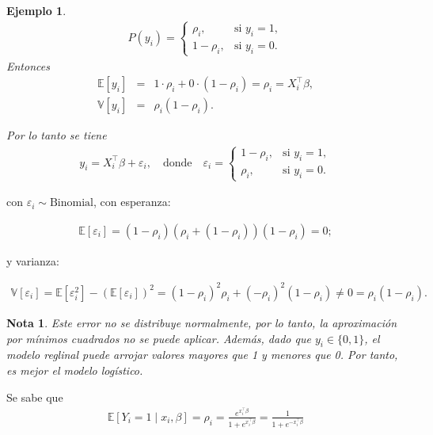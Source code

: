 \documentclass[12pt]{article}
\newtheorem{Note}{Nota}%
\newtheorem{Ejem}{Ejemplo}%
\begin{document}
\begin{Ejem}
\begin{eqnarray*}
P(y_i) = 
\begin{cases}
\rho_i, & \text{si } y_i = 1, \\
1 - \rho_i, & \text{si } y_i = 0.
\end{cases}
\end{eqnarray*}
Entonces
\begin{eqnarray*}
\mathbb{E}[y_i] &=& 1 \cdot \rho_i + 0 \cdot (1 - \rho_i) = \rho_i = X_i^\top \beta,\\
\mathbb{V}[y_i] &=& \rho_i (1 - \rho_i).
\end{eqnarray*}

Por lo tanto se tiene
\begin{eqnarray*}
y_i = X_i^\top \beta + \varepsilon_i, \quad \text{donde} \quad
\varepsilon_i =
\begin{cases}
1 - \rho_i, & \text{si } y_i = 1, \\
 \rho_i, & \text{si } y_i = 0.
\end{cases}
\end{eqnarray*}

\end{Ejem}
con $\varepsilon_i \sim \text{Binomial}$, con esperanza:

\begin{eqnarray*}
\mathbb{E}[\varepsilon_i] = (1 - \rho_i)(\rho_i + (1 - \rho_i))(1 - \rho_i) = 0;
\end{eqnarray*}

y varianza:

\begin{eqnarray*}
\mathbb{V}[\varepsilon_i] = \mathbb{E}[\varepsilon_i^2] - (\mathbb{E}[\varepsilon_i])^2
= (1 - \rho_i)^2 \rho_i + (-\rho_i)^2 (1 - \rho_i) \neq 0
= \rho_i (1 - \rho_i).
\end{eqnarray*}

\begin{Note}
Este error no se distribuye normalmente, por lo tanto, la aproximación por mínimos cuadrados no se puede aplicar. Además, dado que \( y_i \in \{0, 1\} \), el modelo reglinal puede arrojar valores mayores que 1 y menores que 0. Por tanto, es mejor el modelo logístico.
\end{Note}

Se sabe que 
\begin{eqnarray*}
\mathbb{E}[Y_i = 1 \mid x_i, \beta] = \rho_i = \frac{e^{x_i^\top \beta}}{1 + e^{x_i^\top \beta}} = \frac{1}{1 + e^{-x_i^\top \beta}}
\end{eqnarray*}
\end{document}
